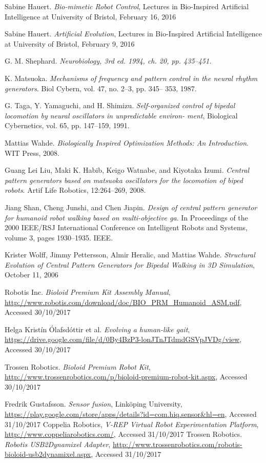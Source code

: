 \begin{thebibliography}{69}
Sabine Hauert. \textit{Bio-mimetic
Robot Control}, Lectures in Bio-Inspired Artificial Intelligence at University of Bristol, February 16, 2016

Sabine Hauert. \textit{Artificial Evolution}, Lectures in Bio-Inspired Artificial Intelligence at University of Bristol, February 9, 2016

G. M. Shephard. \textit{Neurobiology, 3rd ed. 1994, ch. 20, pp. 435–451.}

K. Matsuoka. \textit{Mechanisms of frequency and pattern control in the neural rhythm generators}. Biol Cybern, vol. 47, no. 2–3, pp. 345– 353, 1987.

G. Taga, Y. Yamaguchi, and H. Shimizu. \textit{Self-organized control of bipedal locomotion by neural oscillators in unpredictable environ- ment}, Biological Cybernetics, vol. 65, pp. 147–159, 1991.

Mattias Wahde. \textit{Biologically Inspired Optimization Methods: An Introduction}. WIT Press, 2008.

Guang Lei Liu, Maki K. Habib, Keigo Watnabe, and Kiyotaka Izumi. \textit{Central pattern generators based on matsuoka oscillators for the locomotion of biped robots}. Artif Life Robotics, 12:264–269, 2008.

Jiang Shan, Cheng Junshi, and Chen Jiapin. \textit{Design of central pattern generator for humanoid robot walking based on multi-objective ga}. In Proceedings of the 2000 IEEE/RSJ International Conference on Intelligent Robots and Systems, volume 3, pages 1930–1935. IEEE.

Krister Wolff, Jimmy Pettersson, Almir Heralic, and Mattias Wahde. \textit{Structural Evolution of Central Pattern Generators for Bipedal Walking in 3D Simulation}, October 11, 2006

Robotis Inc. \textit{Bioloid Premium Kit Assembly Manual}, \url{http://www.robotis.com/download/doc/BIO_PRM_Humanoid_ASM.pdf}, Accessed 30/10/2017

Helga Kristín Ólafsdóttir et al. \textit{Evolving a human-like gait}, \url{https://drive.google.com/file/d/0By4BzP3-lonJTnJTdmdGSVpJVDg/view}, Accessed 30/10/2017

Trossen Robotics. \textit{Bioloid Premium Robot Kit}, \url{http://www.trossenrobotics.com/p/bioloid-premium-robot-kit.aspx}, Accessed 30/10/2017

Fredrik Gustafsson. \textit{Sensor fusion}, Linköping University, \url{https://play.google.com/store/apps/details?id=com.hiq.sensor&hl=en}, Accessed 31/10/2017
Coppelia Robotics, \textit{V-REP Virtual Robot Experimentation Platform}, \url{http://www.coppeliarobotics.com/}, Accessed 31/10/2017
Trossen Robotics. \textit{Robotis USB2Dynamixel Adapter}, \url{http://www.trossenrobotics.com/robotis-bioloid-usb2dynamixel.aspx}, Accessed 31/10/2017
\end{thebibliography}
